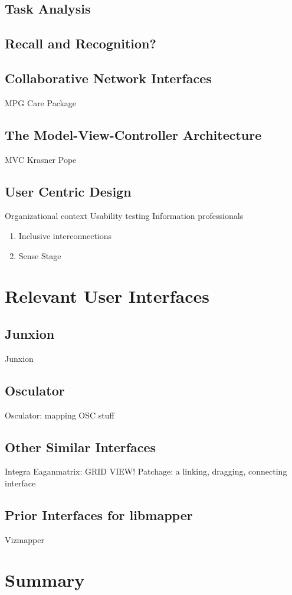 	\subsection{Task Analysis}
	\subsection{Recall and Recognition?}
	\subsection{Collaborative Network Interfaces}
		MPG Care Package 
	\subsection{The Model-View-Controller Architecture}
		MVC Krasner Pope 
	\subsection{User Centric Design}
		Organizational context 
		Usability testing 
		Information professionals 
	\begin{enumerate}
		\item Inclusive interconnections 
		\item Sense Stage 
	\end{enumerate}

\section{Relevant User Interfaces}
	\subsection{Junxion}
		Junxion 
	\subsection{Osculator}
		Osculator: mapping OSC stuff 
	\subsection{Other Similar Interfaces}
		Integra 
		Eaganmatrix: GRID VIEW! 
		Patchage: a linking, dragging, connecting interface 
	\subsection{Prior Interfaces for libmapper} \label{sec:priorGUIs}
		Vizmapper 
	

\section{Summary}
	